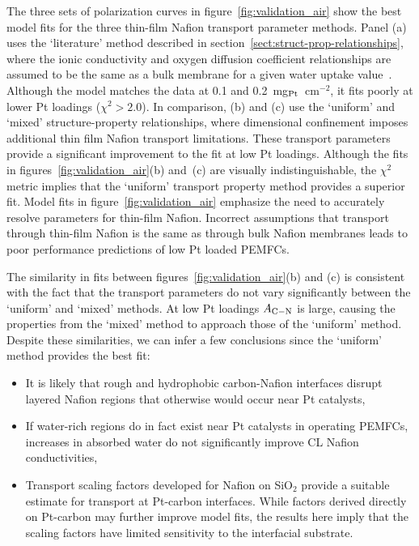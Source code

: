 \documentclass[final,3p,times,twocolumn]{elsarticle}    %
\newcommand{\crr}[1]{\color{red} #1 \color{black}}
\begin{document}
The three sets of polarization curves in figure~\ref{fig:validation_air} show the best model fits for the three thin-film Nafion transport parameter methods. \crr{Panel (a) uses the `literature' method described in section~\ref{sect:struct-prop-relationships}, where the ionic conductivity and oxygen diffusion coefficient relationships are assumed to be the same as a bulk membrane for a given water uptake value~\cite{bib:yadav_2012, bib:sethuraman_2009}.} Although the model matches the data at 0.1 and 0.2~mg$_{\rm Pt}$~cm$^{-2}$, it fits poorly at lower Pt loadings \crr{($\chi^2 > 2.0$).} In comparison, (b) and (c) use the `uniform' and `mixed' structure-property relationships, where dimensional confinement imposes additional thin film Nafion transport limitations. These transport parameters provide a significant improvement to the fit at low Pt loadings. Although the fits in figures~\ref{fig:validation_air}(b) and~(c) are visually indistinguishable, the $\chi^2$ metric implies that the \crr{`uniform'} transport property method provides a superior fit. \crr{Model fits in figure~\ref{fig:validation_air} emphasize the need to accurately resolve parameters for thin-film Nafion. Incorrect assumptions that transport through thin-film Nafion is the same as through bulk Nafion membranes leads to poor performance predictions of low Pt loaded PEMFCs. 

The similarity in fits between figures~\ref{fig:validation_air}(b) and (c) is consistent with the fact that the transport parameters do not vary significantly between the `uniform' and `mixed' methods. At low Pt loadings $A_{\rm C-N}$ is large, causing the properties from the `mixed' method to approach those of the `uniform' method. Despite these similarities, we can infer a few conclusions since the `uniform' method provides the best fit:
\begin{itemize}
    \item It is likely that rough and hydrophobic carbon-Nafion interfaces disrupt layered Nafion regions that otherwise would occur near Pt catalysts,
    \item If water-rich regions do in fact exist near Pt catalysts in operating PEMFCs, increases in absorbed water do not significantly improve CL Nafion conductivities,
    \item Transport scaling factors developed for Nafion on SiO$_2$ provide a suitable estimate for transport at Pt-carbon interfaces. While factors derived directly on Pt-carbon may further improve model fits, the results here imply that the scaling factors have limited sensitivity to the interfacial substrate.
\end{itemize}
}
\end{document}
